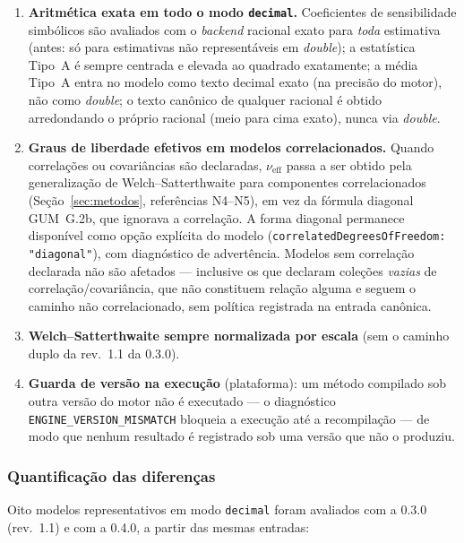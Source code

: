 \documentclass[11pt,a4paper]{article}
\newcommand{\docVersion}{0.4.0}
\newcommand{\previousVersion}{0.3.0}
\begin{document}
\begin{enumerate}[label=(\alph*)]
  \item \textbf{Aritmética exata em todo o modo \texttt{decimal}.} Coeficientes de sensibilidade simbólicos são avaliados com o \emph{backend} racional exato para \emph{toda} estimativa (antes: só para estimativas não representáveis em \emph{double}); a estatística Tipo~A é sempre centrada e elevada ao quadrado exatamente; a média Tipo~A entra no modelo como texto decimal exato (na precisão do motor), não como \emph{double}; o texto canônico de qualquer racional é obtido arredondando o próprio racional (meio para cima exato), nunca via \emph{double}.
  \item \textbf{Graus de liberdade efetivos em modelos correlacionados.} Quando correlações ou covariâncias são declaradas, \(\nu_{\text{eff}}\) passa a ser obtido pela generalização de Welch--Satterthwaite para componentes correlacionados (Seção~\ref{sec:metodos}, referências N4--N5), em vez da fórmula diagonal GUM~G.2b, que ignorava a correlação. A forma diagonal permanece disponível como opção explícita do modelo (\texttt{correlatedDegreesOfFreedom: "diagonal"}), com diagnóstico de advertência. Modelos sem correlação declarada não são afetados --- inclusive os que declaram coleções \emph{vazias} de correlação/covariância, que não constituem relação alguma e seguem o caminho não correlacionado, sem política registrada na entrada canônica.
  \item \textbf{Welch--Satterthwaite sempre normalizada por escala} (sem o caminho duplo da rev.\ 1.1 da \previousVersion).
  \item \textbf{Guarda de versão na execução} (plataforma): um método compilado sob outra versão do motor não é executado --- o diagnóstico \texttt{ENGINE\_VERSION\_MISMATCH} bloqueia a execução até a recompilação --- de modo que nenhum resultado é registrado sob uma versão que não o produziu.
\end{enumerate}

\subsubsection*{Quantificação das diferenças}

Oito modelos representativos em modo \texttt{decimal} foram avaliados com a \previousVersion{} (rev.\ 1.1) e com a \docVersion{}, a partir das mesmas entradas:
\end{document}
